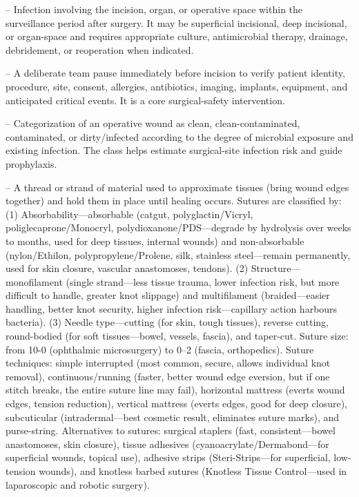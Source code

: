 -- Infection involving the incision, organ, or operative space within the surveillance period after surgery. It may be superficial incisional, deep incisional, or organ-space and requires appropriate culture, antimicrobial therapy, drainage, debridement, or reoperation when indicated.

-- A deliberate team pause immediately before incision to verify patient identity, procedure, site, consent, allergies, antibiotics, imaging, implants, equipment, and anticipated critical events. It is a core surgical-safety intervention.

-- Categorization of an operative wound as clean, clean-contaminated, contaminated, or dirty/infected according to the degree of microbial exposure and existing infection. The class helps estimate surgical-site infection risk and guide prophylaxis.

-- A thread or strand of material used to approximate tissues (bring wound edges together) and hold them in place until healing occurs. Sutures are classified by: (1) Absorbability—absorbable (catgut, polyglactin/Vicryl, poliglecaprone/Monocryl, polydioxanone/PDS—degrade by hydrolysis over weeks to months, used for deep tissues, internal wounds) and non-absorbable (nylon/Ethilon, polypropylene/Prolene, silk, stainless steel—remain permanently, used for skin closure, vascular anastomoses, tendons). (2) Structure—monofilament (single strand—less tissue trauma, lower infection risk, but more difficult to handle, greater knot slippage) and multifilament (braided—easier handling, better knot security, higher infection risk—capillary action harbours bacteria). (3) Needle type—cutting (for skin, tough tissues), reverse cutting, round-bodied (for soft tissues—bowel, vessels, fascia), and taper-cut. Suture size: from 10-0 (ophthalmic microsurgery) to 0--2 (fascia, orthopedics). Suture techniques: simple interrupted (most common, secure, allows individual knot removal), continuous/running (faster, better wound edge eversion, but if one stitch breaks, the entire suture line may fail), horizontal mattress (everts wound edges, tension reduction), vertical mattress (everts edges, good for deep closure), subcuticular (intradermal—best cosmetic result, eliminates suture marks), and purse-string. Alternatives to sutures: surgical staplers (fast, consistent—bowel anastomoses, skin closure), tissue adhesives (cyanoacrylate/Dermabond—for superficial wounds, topical use), adhesive strips (Steri-Strips—for superficial, low-tension wounds), and knotless barbed sutures (Knotless Tissue Control—used in laparoscopic and robotic surgery).

